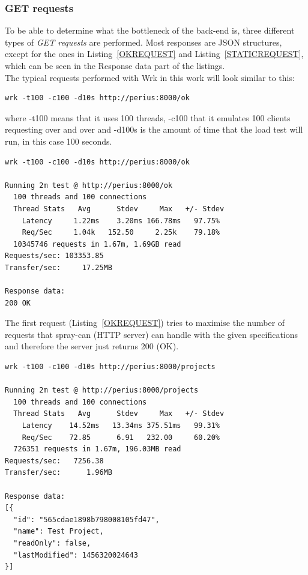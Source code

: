 \documentclass[a4paper,12pt]{article}
\newenvironment{custommargins}[2]%
  {\addtolength{\leftskip}{#1}\addtolength{\rightskip}{#2}}{\par}
\begin{document}
\subsubsection{GET requests} \label{sec:GET_REQUESTS}
To be able to determine what the bottleneck of the back-end is, three different types of \textit{GET
requests} are performed. Most responses are JSON structures, except for the ones in
Listing~\ref{OKREQUEST} and Listing~\ref{STATICREQUEST}, which can be seen in the Response data part
of the listings.\\

The typical requests performed with Wrk in this work will look similar to this:
\begin{lstlisting}[frame=single]
wrk -t100 -c100 -d10s http://perius:8000/ok
\end{lstlisting}
where -t100 means that it uses 100 threads, -c100 that it emulates 100 clients requesting over and
over and -d100s is the amount of time that the load test will run, in this case 100 seconds.

\begin{minipage}{\linewidth-1cm}
\begin{lstlisting}[label=OKREQUEST,caption=Result of OK requests]
wrk -t100 -c100 -d10s http://perius:8000/ok

Running 2m test @ http://perius:8000/ok
  100 threads and 100 connections
  Thread Stats   Avg      Stdev     Max   +/- Stdev
    Latency     1.22ms    3.20ms 166.78ms   97.75%
    Req/Sec     1.04k   152.50     2.25k    79.18%
  10345746 requests in 1.67m, 1.69GB read
Requests/sec: 103353.85
Transfer/sec:     17.25MB

Response data:
200 OK
\end{lstlisting}
\end{minipage}

\par
The first request (Listing~\ref{OKREQUEST}) tries to maximise the number of requests that spray-can
(HTTP server) can handle with the given specifications and therefore the server just returns 200
(OK).

\begin{custommargins}{0cm}{-2cm}
\begin{minipage}{\linewidth-1cm}
\begin{lstlisting}[label=DBREQUEST,caption=Result of MongoDB requests]
wrk -t100 -c100 -d10s http://perius:8000/projects

Running 2m test @ http://perius:8000/projects
  100 threads and 100 connections
  Thread Stats   Avg      Stdev     Max   +/- Stdev
    Latency    14.52ms   13.34ms 375.51ms   99.31%
    Req/Sec    72.85      6.91   232.00     60.20%
  726351 requests in 1.67m, 196.03MB read
Requests/sec:   7256.38
Transfer/sec:      1.96MB

Response data:
[{
  "id": "565cdae1898b798008105fd47",
  "name": Test Project,
  "readOnly": false,
  "lastModified": 1456320024643
}]
\end{lstlisting}
\end{minipage}
\end{custommargins}
\end{document}

